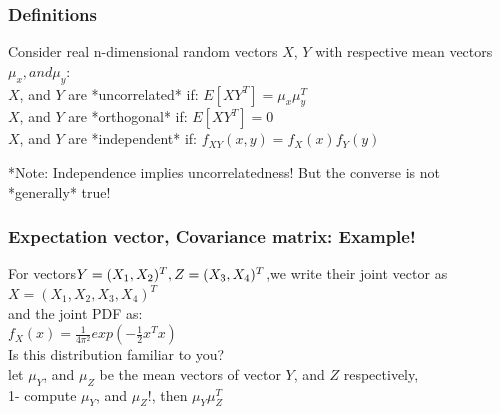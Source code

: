\documentclass{beamer}
\begin{document}
\begin{frame}
\frametitle{Definitions}
Consider real n-dimensional random vectors $X$, $Y$ with respective mean vectors $\mu_x, and \mu_y $:\newline\\
$X$, and $Y$ are *uncorrelated* if:\newline
$E[XY^T]=\mu_x\mu_y^T$\newline\\

$X$, and $Y$ are *orthogonal* if:\newline
$E[XY^T]=0$\newline\\

$X$, and $Y$ are *independent* if:\newline
$f_{XY}(x,y)=f_X(x)f_Y(y)$\newline

*Note: Independence implies uncorrelatedness! But the converse is not *generally* true!
\end{frame}

\begin{frame}
\frametitle{Expectation vector, Covariance matrix: Example!}
For vectors\newline $Y = (X_1,X_2)^T,\newline Z=(X_3,X_4)^T$,\newline we write their joint vector as\newline $X= (X_1,X_2,X_3,X_4)^T$\newline\\
and the joint PDF as:\newline\\
$f_X (x) = \frac{1}{4\pi^2}{exp(-\frac{1}{2}x^Tx)}$ \newline\\
Is this distribution familiar to you? \newline\\
let $\mu_Y$, and $\mu_Z$ be the mean vectors of vector $Y$, and $Z$ respectively,\newline\\
1- compute $\mu_Y$, and $\mu_Z$!, then $\mu_Y \mu_Z^T$
\end{frame}
\end{document}
